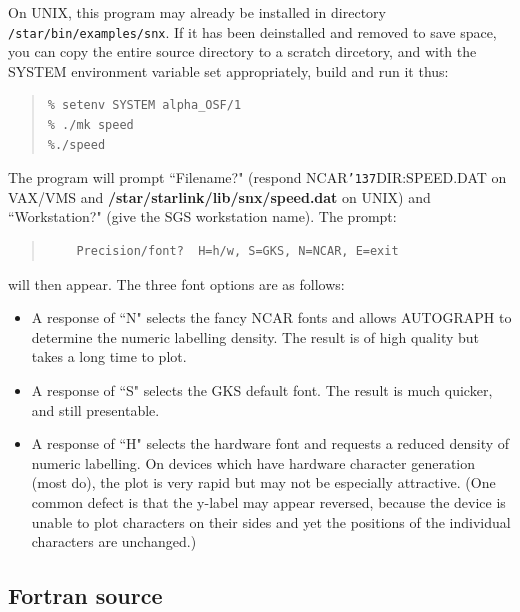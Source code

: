 \documentclass[11pt]{article}
\renewcommand{\_}{{\tt\char'137}}     %
\begin{document}
On UNIX, this program may already be installed in directory 
{\tt /star/bin/examples/snx}.  If it has been deinstalled and removed to save
space, you can copy the entire source directory to a scratch dircetory, and
with the SYSTEM environment variable set appropriately, build and run it thus:

\begin {quote}
\begin{verbatim}
% setenv SYSTEM alpha_OSF/1
% ./mk speed
%./speed
\end{verbatim}
\end {quote}


The program will prompt ``Filename?" (respond NCAR\_DIR:SPEED.DAT on VAX/VMS
and {\bf /star/\-starlink/\-lib/\-snx/speed.dat} on UNIX) and ``Workstation?" 
(give the SGS workstation name). 
The prompt:

\begin {quote}
\begin{verbatim}
    Precision/font?  H=h/w, S=GKS, N=NCAR, E=exit
\end{verbatim}
\end {quote}

will then appear.
The three font options are as follows:

\begin{itemize}
\item A response of ``N" selects the fancy NCAR fonts and allows
AUTOGRAPH to determine the numeric labelling density.
The result is of high quality but takes a long time to plot.
\item A response of ``S" selects the GKS default font.
The result is much quicker, and still presentable.
\item A response of ``H" selects the hardware font and requests
a reduced density of numeric labelling.
On devices which have hardware character generation (most do),
the plot is very rapid but may not be especially attractive.
(One common defect is that the y-label may appear reversed, because the
device is unable to plot characters on their sides and yet the
positions of the individual characters are unchanged.)
\end{itemize}


\subsection {Fortran source}
\end{document}
